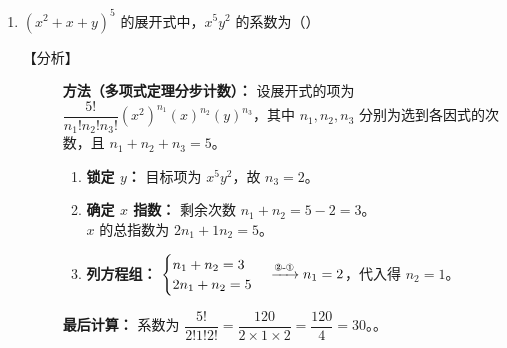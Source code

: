 \documentclass[11pt,a4paper]{article}
\newlength{\myspace}             %
\begin{document}
\begin{enumerate}[label=\arabic*., start=6, leftmargin=1.5em]
    \begin{description}
        \item[【分析】] 
        分步讨论 $(x+y)^5$ 中哪些项与前括号相乘能产生 $x^3y^3$：
        \begin{enumerate}[label=\textcircled{\small\arabic*}]
            \item \textbf{前项 $x$：} 需乘以后项展开式中的 $x^2y^3$。\\
            由通项 $C_5^r x^{5-r} y^r$ 知，令 $r=3$，对应项为 $C_5^3 x^2 y^3$。\\
            此部分贡献系数：$1 \cdot C_5^3 = C_5^2 = \dfrac{5 \times 4}{2 \times 1} = 10$。
            \item \textbf{后项 $\dfrac{y^2}{x}$：} 需乘以后项展开式中的 $x^4y^1$。\\
            由通项公式知，令 $r=1$，对应项为 $C_5^1 x^4 y^1$。\\
            计算过程：$\dfrac{y^2}{x} \cdot (C_5^1 x^4 y^1) = 5 \cdot x^3 y^3$。\\
            此部分贡献系数：$C_5^1 = 5$。
        \end{enumerate}
        \textbf{计算结果：} $10 + 5 = 15$。
    \end{description}

    \vspace{\myspace}

    \item $(x^2 + x + y)^5$ 的展开式中，$x^5y^2$ 的系数为（\quad）
    
    \begin{description}
        \item[【分析】] 
        \textbf{方法（多项式定理分步计数）：} 
        设展开式的项为 $\dfrac{5!}{n_1! n_2! n_3!} (x^2)^{n_1} (x)^{n_2} (y)^{n_3}$，其中 $n_1, n_2, n_3$ 分别为选到各因式的次数，且 $n_1+n_2+n_3=5$。
        \begin{enumerate}[label=\textcircled{\small\arabic*}]
            \item \textbf{锁定 $y$：} 目标项为 $x^5y^2$，故 $n_3=2$。
            \item \textbf{确定 $x$ 指数：} 剩余次数 $n_1+n_2 = 5 - 2 = 3$。\\
            $x$ 的总指数为 $2n_1 + 1n_2 = 5$。
            \item \textbf{列方程组：} 
            $\begin{cases} n_1 + n_2 = 3 \\ 2n_1 + n_2 = 5 \end{cases} \xrightarrow{\text{\ding{173}-\ding{172}}} n_1 = 2$，代入得 $n_2 = 1$。
        \end{enumerate}
        \textbf{最后计算：} 系数为 $\dfrac{5!}{2! 1! 2!} = \dfrac{120}{2 \times 1 \times 2} = \dfrac{120}{4} = 30$。。
    \end{description}


\end{enumerate}
\end{document}

